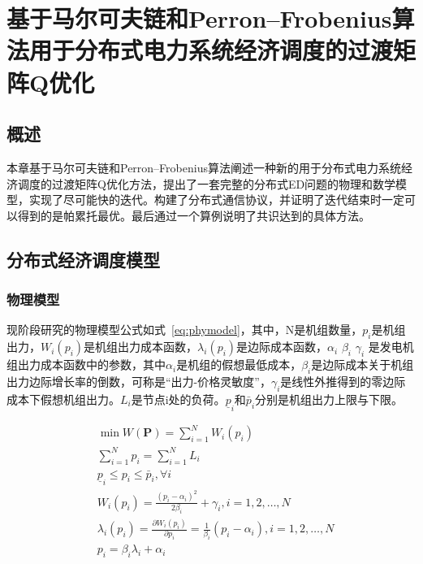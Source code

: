 \chapter{基于马尔可夫链和Perron–Frobenius算法用于分布式电力系统经济调度的过渡矩阵Q优化}
\label{cha:Algorithm}

\section{概述}

本章基于马尔可夫链和Perron–Frobenius算法\cite{yan2019consensus}阐述一种新的用于分布式电力系统经济调度的过渡矩阵Q优化方法，提出了一套完整的分布式ED问题的物理和数学模型，实现了尽可能快的迭代。构建了分布式通信协议，并证明了迭代结束时一定可以得到的是帕累托最优。最后通过一个算例说明了共识达到的具体方法。

\section{分布式经济调度模型}

\subsection{物理模型}

现阶段研究的物理模型公式如式~\ref{eq:phymodel}，其中，N是机组数量，$p_{i}$是机组出力，$W_{i}\left(p_{i}\right)$是机组出力成本函数，$\lambda_{i}\left(p_{i}\right)$是边际成本函数，$\alpha_{i}$ $\beta_{i}$ $\gamma_{i}$ 是发电机组出力成本函数中的参数，其中$\alpha_{i}$是机组的假想最低成本，$\beta_{i}$是边际成本关于机组出力边际增长率的倒数，可称是“出力-价格灵敏度”，$\gamma_{i}$是线性外推得到的零边际成本下假想机组出力。$L_{i}$是节点i处的负荷。$\underline{p}_{i}$和$\bar{p}_{i}$分别是机组出力上限与下限。

\begin{equation}
    \begin{aligned}
    &\min W(\mathbf{P})=\sum_{i=1}^{N} W_{i}\left(p_{i}\right)\\
    &\sum_{i=1}^{N} p_{i}=\sum_{i=1}^{N} L_{i}\\
    &\underline{p}_{i} \leq p_{i} \leq \bar{p}_{i}, \forall i\\
    &W_{i}\left(p_{i}\right)=\frac{\left(p_{i}-\alpha_{i}\right)^{2}}{2 \beta_{i}}+\gamma_{i}, i=1,2, \ldots, N\\
    &\lambda_{i}\left(p_{i}\right)=\frac{\partial W_{i}\left(p_{i}\right)}{\partial p_{i}}=\frac{1}{\beta_{i}}\left(p_{i}-\alpha_{i}\right), i=1,2, \ldots, N\\
    &p_{i}=\beta_{i} \lambda_{i}+\alpha_{i}
    \end{aligned}
    \label{eq:phymodel} 
\end{equation}

